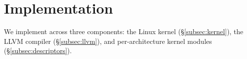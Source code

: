 









\section{Implementation}
\label{sec:implementation}

We implement \lang across three components: the Linux kernel (\S\ref{subsec:kernel}), the LLVM compiler (\S\ref{subsec:llvm}), and per-architecture kernel modules (\S\ref{subsec:descriptors}).

